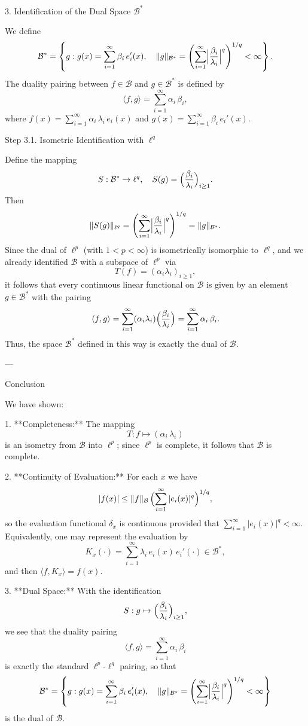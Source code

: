 3. Identification of the Dual Space \(\mathcal{B}^*\)

We define
\[
\mathcal{B}^* = \left\{ g : g(x)=\sum_{i=1}^\infty \beta_i\, e_i'(x),\quad \|g\|_{\mathcal{B}^*} = \left(\sum_{i=1}^\infty \Bigl|\frac{\beta_i}{\lambda_i}\Bigr|^q\right)^{1/q} < \infty \right\}.
\]
The duality pairing between \(f\in\mathcal{B}\) and \(g\in \mathcal{B}^*\) is defined by
\[
\langle f, g\rangle = \sum_{i=1}^\infty \alpha_i\,\beta_i,
\]
where \(f(x)=\sum_{i=1}^\infty \alpha_i\,\lambda_i\, e_i(x)\) and \(g(x)=\sum_{i=1}^\infty \beta_i\, e_i'(x)\).

Step 3.1. Isometric Identification with \(\ell^q\)

Define the mapping
\[
S:\mathcal{B}^* \to \ell^q,\quad S(g)= \Bigl(\frac{\beta_i}{\lambda_i}\Bigr)_{i\ge1}.
\]
Then
\[
\|S(g)\|_{\ell^q} = \left(\sum_{i=1}^\infty \Bigl|\frac{\beta_i}{\lambda_i}\Bigr|^q\right)^{1/q} = \|g\|_{\mathcal{B}^*}.
\]
Since the dual of \(\ell^p\) (with \(1<p<\infty\)) is isometrically isomorphic to \(\ell^q\), and we already identified \(\mathcal{B}\) with a subspace of \(\ell^p\) via
\[
T(f) = (\alpha_i\lambda_i)_{i\ge1},
\]
it follows that every continuous linear functional on \(\mathcal{B}\) is given by an element \(g\in \mathcal{B}^*\) with the pairing
\[
\langle f, g\rangle = \sum_{i=1}^\infty (\alpha_i\lambda_i)\Bigl(\frac{\beta_i}{\lambda_i}\Bigr)= \sum_{i=1}^\infty \alpha_i\,\beta_i.
\]
Thus, the space \(\mathcal{B}^*\) defined in this way is exactly the dual of \(\mathcal{B}\).

---

 Conclusion

We have shown:

1. **Completeness:** The mapping
   \[
   T: f\mapsto (\alpha_i\,\lambda_i)
   \]
   is an isometry from \(\mathcal{B}\) into \(\ell^p\); since \(\ell^p\) is complete, it follows that \(\mathcal{B}\) is complete.

2. **Continuity of Evaluation:** For each \(x\) we have
   \[
   |f(x)|\le \|f\|_{\mathcal{B}}\,\Bigl(\sum_{i=1}^\infty |e_i(x)|^q\Bigr)^{1/q},
   \]
   so the evaluation functional \(\delta_x\) is continuous provided that
   \(\sum_{i=1}^\infty |e_i(x)|^q<\infty\). Equivalently, one may represent the evaluation by
   \[
   K_x(\cdot)=\sum_{i=1}^\infty \lambda_i\, e_i(x)\, e_i'(\cdot)\in\mathcal{B}^*,
   \]
   and then \(\langle f, K_x\rangle=f(x)\).

3. **Dual Space:** With the identification
   \[
   S: g\mapsto \Bigl(\frac{\beta_i}{\lambda_i}\Bigr)_{i\ge1},
   \]
   we see that the duality pairing
   \[
   \langle f, g\rangle = \sum_{i=1}^\infty \alpha_i\,\beta_i
   \]
   is exactly the standard \(\ell^p\)-\(\ell^q\) pairing, so that
   \[
   \mathcal{B}^* = \left\{ g : g(x)=\sum_{i=1}^\infty \beta_i\, e_i'(x),\quad \|g\|_{\mathcal{B}^*}=\left(\sum_{i=1}^\infty \Bigl|\frac{\beta_i}{\lambda_i}\Bigr|^q\right)^{1/q}<\infty \right\}
   \]
   is the dual of \(\mathcal{B}\).

